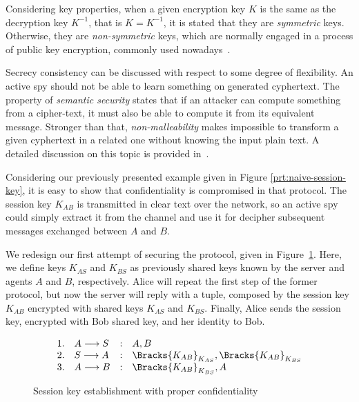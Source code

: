 Considering key properties, when a given encryption key \(K\) is the same as the decryption key \(K^{-1}\), that is \(K = K^{-1}\), it is stated that they are \emph{symmetric} keys. Otherwise, they are \emph{non-symmetric} keys, which are normally engaged in a process of public key encryption, commonly used nowadays~\cite{RyanSchneider2010}.

Secrecy consistency can be discussed with respect to some degree of flexibility. An active spy should not be able to learn something on generated cyphertext. The property of \textit{semantic security} states that if an attacker can compute something from a cipher-text, it must also be able to compute it from its equivalent message. Stronger than that, \textit{non-malleability} makes impossible to transform a given cyphertext in a related one without knowing the input plain text. A detailed discussion on this topic is provided in~\cite{Abadi99}.

Considering our previously presented example given in Figure \ref{prt:naive-session-key}, it is easy to show that confidentiality is compromised in that protocol. The session key \(K_{AB}\) is transmitted in clear text over the network, so an active spy could simply extract it from the channel and use it for decipher subsequent messages exchanged between \(A\) and \(B\).

We redesign our first attempt of securing the protocol, given in Figure~\ref{prt:session-key-confidentiality}. Here, we define keys \(K_{AS}\) and \(K_{BS}\) as previously shared keys known by the server and agents \(A\) and \(B\), respectively. Alice will repeat the first step of the former protocol, but now the server will reply with a tuple, composed by the session key \(K_{AB}\) encrypted with shared keys \(K_{AS}\) and \(K_{BS}\). Finally, Alice sends the session key, encrypted with Bob shared key, and her identity to Bob.

\begin{figure}[ht]
  \centering
  \[
    \begin{array}{rlcl}
      1. & A \longrightarrow S &:& A, B \\
      2. & S \longrightarrow A &:& \Bracks{K_{AB}}_{K_{AS}}, \Bracks{K_{AB}}_{K_{BS}} \\
      3. & A \longrightarrow B &:& \Bracks{K_{AB}}_{K_{BS}},A \\
    \end{array}
  \]
  \caption{Session key establishment with proper confidentiality}
  \label{prt:session-key-confidentiality}
\end{figure}

